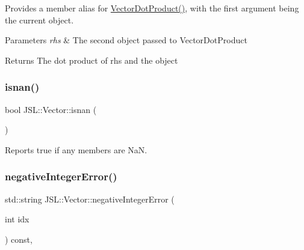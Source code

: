 Provides a member alias for \hyperlink{namespaceJSL_aeae64b7e0cfdc1ab5f35cca90c32d9f6}{Vector\+Dot\+Product()}, with the first argument being the current object. 


\begin{DoxyParams}{Parameters}
{\em rhs} & The second object passed to Vector\+Dot\+Product \\
\hline
\end{DoxyParams}
\begin{DoxyReturn}{Returns}
The dot product of rhs and the object 
\end{DoxyReturn}
\mbox{\label{classJSL_1_1Vector_ad7dc3af5e90b59e3ba2efc458e192a4c}} 
\subsubsection{\texorpdfstring{isnan()}{isnan()}}
{\footnotesize\ttfamily bool J\+S\+L\+::\+Vector\+::isnan (\begin{DoxyParamCaption}{ }\end{DoxyParamCaption})\hspace{0.3cm}{\ttfamily [inline]}}



Reports true if any members are NaN. 

\mbox{\label{classJSL_1_1Vector_ac41d3cb075c2bd871c31b96dedba08fe}} 
\subsubsection{\texorpdfstring{negative\+Integer\+Error()}{negativeIntegerError()}}
{\footnotesize\ttfamily std\+::string J\+S\+L\+::\+Vector\+::negative\+Integer\+Error (\begin{DoxyParamCaption}\item[{int}]{idx }\end{DoxyParamCaption}) const\hspace{0.3cm}{\ttfamily [inline]}, {\ttfamily [protected]}}

\mbox{\label{classJSL_1_1Vector_aa8af717591f5548ff471b6e4b28d7f9c}} 
